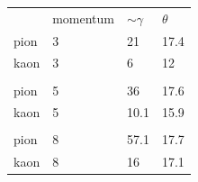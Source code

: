             \begin{table}[H]
                \centering
                    \begin{tabular}{llll}
                         & momentum & $\sim \gamma$ & $\theta$  \\
                    pion & 3        & 21            & 17.4                      \\
                    kaon & 3        & 6             & 12                        \\
                         &          &               &                         \\
                    pion & 5      & 36            & 17.6                      \\
                    kaon & 5       & 10.1             & 15.9                        \\
                         &          &               &                          \\
                    pion & 8      & 57.1            & 17.7                      \\
                    kaon & 8       & 16             & 17.1                        \\
                    
                    \end{tabular}
            \end{table}
            
        
            
            
            
